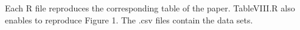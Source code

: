 Each R file reproduces the corresponding table of the paper.
TableVIII.R also enables to reproduce Figure 1. The .csv files
contain the data sets.
